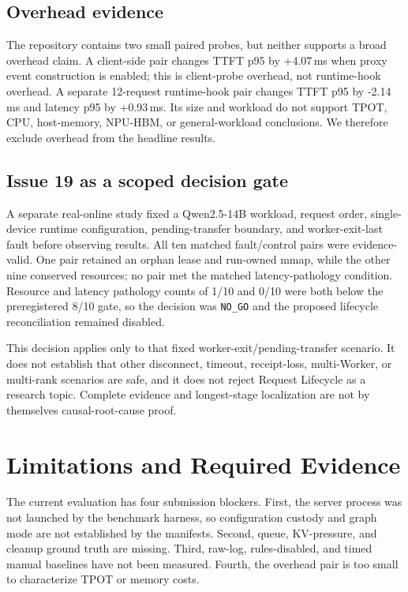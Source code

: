 \documentclass[sigconf,screen,nonacm]{acmart}
\begin{document}
\subsection{Overhead evidence}

The repository contains two small paired probes, but neither supports a broad
overhead claim. A client-side pair changes TTFT p95 by +4.07\,ms when proxy
event construction is enabled; this is client-probe overhead, not runtime-hook
overhead. A separate 12-request runtime-hook pair changes TTFT p95 by
-2.14\,ms and latency p95 by +0.93\,ms. Its size and workload do not support
TPOT, CPU, host-memory, NPU-HBM, or general-workload conclusions. We therefore
exclude overhead from the headline results.

\subsection{Issue 19 as a scoped decision gate}

A separate real-online study fixed a Qwen2.5-14B workload, request order,
single-device runtime configuration, pending-transfer boundary, and
worker-exit-last fault before observing results. All ten matched fault/control
pairs were evidence-valid. One pair retained an orphan lease and run-owned
mmap, while the other nine conserved resources; no pair met the matched
latency-pathology condition. Resource and latency pathology counts of 1/10 and
0/10 were both below the preregistered 8/10 gate, so the decision was
\texttt{NO\_GO} and the proposed lifecycle reconciliation remained disabled.

This decision applies only to that fixed worker-exit/pending-transfer scenario.
It does not establish that other disconnect, timeout, receipt-loss,
multi-Worker, or multi-rank scenarios are safe, and it does not reject Request
Lifecycle as a research topic. Complete evidence and longest-stage localization
are not by themselves causal-root-cause proof.

\section{Limitations and Required Evidence}

The current evaluation has four submission blockers. First, the server process
was not launched by the benchmark harness, so configuration custody and graph
mode are not established by the manifests. Second, queue, KV-pressure, and
cleanup ground truth are missing. Third, raw-log, rules-disabled, and timed
manual baselines have not been measured. Fourth, the overhead pair is too small
to characterize TPOT or memory costs.
\end{document}
